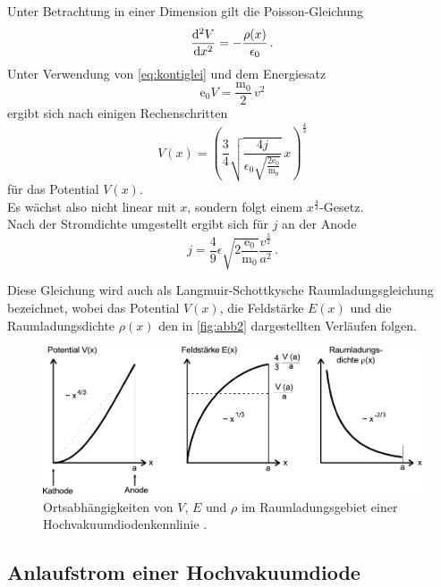 Unter Betrachtung in einer Dimension gilt die Poisson-Gleichung
\begin{equation}
    \dfrac{\mathrm{d}^2 V}{\mathrm{d} x^2} = - \dfrac{\rho (x)}{\epsilon_0} \,.
\end{equation}
Unter Verwendung von \eqref{eq:kontiglei} und dem Energiesatz
\begin{equation*}
    \text{e}_0 V = \dfrac{\text{m}_0}{2} \, v^2
\end{equation*}
ergibt sich nach einigen Rechenschritten
\begin{equation*}
    V(x) = \left(\dfrac{3}{4} \sqrt{\dfrac{4j}{\epsilon_0 \sqrt{\frac{2\text{e}_0}{\text{m}_0}}}} \, x \right)^{\frac{4}{3}}
    \label{eq:potential}
\end{equation*}
für das Potential $V(x)$. \\

Es wächst also nicht linear mit $x$, sondern folgt einem $x^{\frac{4}{3}}$-Gesetz. \\

Nach der Stromdichte umgestellt ergibt sich für $j$ an der Anode
\begin{equation}
    j = \dfrac{4}{9} \epsilon \sqrt{2\frac{\text{e}_0}{\text{m}_0}} \dfrac{v^{\frac{3}{2}}}{a^2} \,.
    \label{eq:anodestromdichte}
\end{equation}

Diese Gleichung wird auch als Langmuir-Schottkysche Raumladungsgleichung bezeichnet,
wobei das Potential $V(x)$, die Feldstärke $E(x)$ und die Raumladungsdichte $\rho(x)$
den in \autoref{fig:abb2} dargestellten Verläufen folgen.

\begin{figure}[H]
    \centering
    \includegraphics{figures/Abb4.pdf}
    \caption{Ortsabhängigkeiten von $V$, $E$ und $\rho$ im Raumladungsgebiet
             einer Hochvakuumdiodenkennlinie \cite{ap09}.}
    \label{fig:abb4}
\end{figure}


\subsection{Anlaufstrom einer Hochvakuumdiode}

